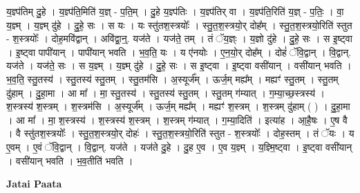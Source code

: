 \documentclass[17pt]{extarticle}
\begin{document}
य॒ज्ञ्प॑तिम् दु॒हे । य॒ज्ञ्प॑ति॒मिति॑ य॒ज्ञ् - प॒ति॒म् । दु॒हे य॒ज्ञ्प॑तिः । य॒ज्ञ्प॑तिर् वा । य॒ज्ञ्प॑ति॒रिति॑ य॒ज्ञ् - प॒तिः॒ । वा॒ य॒ज्ञ्म् । य॒ज्ञ्म् दु॑हे । दु॒हे॒ सः । स यः । यः स्तु॑तश॒स्त्रयोः᳚ । स्तु॒त॒श॒स्त्रयो॒र् दोह᳚म् । स्तु॒त॒श॒स्त्रयो॒रिति॑ स्तुत - श॒स्त्रयोः᳚ । दोह॒मवि॑द्वान् । अवि॑द्वा॒न्॒. यज॑ते । यज॑ते॒ तम् । तं ॅय॒ज्ञ्ः । य॒ज्ञो दु॑हे । दु॒हे॒ सः । स इ॒ष्ट्वा । इ॒ष्ट्वा पापी॑यान् । पापी॑यान् भवति । भ॒व॒ति॒ यः । य ए॑नयोः । ए॒न॒यो॒र् दोह᳚म् । दोहं॑ ॅवि॒द्वान् । वि॒द्वान्. यज॑ते । यज॑ते॒ सः । स य॒ज्ञ्म् । य॒ज्ञ्म् दु॑हे । दु॒हे॒ सः । स इ॒ष्ट्वा । इ॒ष्ट्वा वसी॑यान् । वसी॑यान् भवति । भ॒व॒ति॒ स्तु॒तस्य॑ । स्तु॒तस्य॑ स्तु॒तम् । स्तु॒तम॑सि । अ॒स्यूर्ज᳚म् । ऊर्ज॒म् मह्य᳚म् । मह्यꣳ॑ स्तु॒तम् । स्तु॒तम् दु॑हाम् । दु॒हा॒मा । आ मा᳚ । मा॒ स्तु॒तस्य॑ । स्तु॒तस्य॑ स्तु॒तम् । स्तु॒तम् ग॑म्यात् । ग॒म्या॒च्छ॒स्त्रस्य॑ । श॒स्त्रस्य॑ श॒स्त्रम् । श॒स्त्रम॑सि । अ॒स्यूर्ज᳚म् । ऊर्ज॒म् मह्य᳚म् । मह्यꣳ॑ श॒स्त्रम् । श॒स्त्रम् दु॑हाम् ( ) । दु॒हा॒मा । आ मा᳚ । मा॒ श॒स्त्रस्य॑ । श॒स्त्रस्य॑ श॒स्त्रम् । श॒स्त्रम् ग॑म्यात् । ग॒म्या॒दिति॑ । इत्या॑ह । आ॒है॒षः । ए॒ष वै । वै स्तु॑तश॒स्त्रयोः᳚ । स्तु॒त॒श॒स्त्रयो॒र् दोहः॑ । स्तु॒त॒श॒स्त्रयो॒रिति॑ स्तुत - श॒स्त्रयोः᳚ । दोह॒स्तम् । तं ॅयः । य ए॒वम् । ए॒वं ॅवि॒द्वान् । वि॒द्वान्. यज॑ते । यज॑ते दु॒हे । दु॒ह ए॒व । ए॒व य॒ज्ञ्म् । य॒ज्ञ्मि॒ष्ट्वा । इ॒ष्ट्वा वसी॑यान् । वसी॑यान् भवति । भ॒व॒तीति॑ भवति । \newline

\textbf{Jatai Paata} \newline
\end{document}
